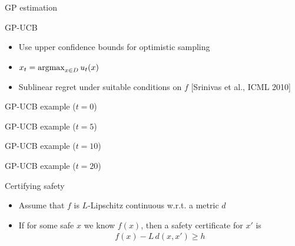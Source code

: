\documentclass[xetex,10pt,mathserif]{beamer}
\newlength\figureheight
\newlength\figurewidth
\begin{document}
\begin{frame}{GP estimation}
\centering
\setlength\figurewidth{5in}
\setlength\figureheight{3.5in}

\end{frame}

\begin{frame}{GP-UCB}
\begin{itemize}
\item<1-> Use upper confidence bounds for optimistic sampling
\vspace{2em}
\item<2-> $x_t = \argmax_{x \in D}u_t(x)$
\vspace{2em}
\item<3-> Sublinear regret under suitable conditions on $f$ [Srinivas et al., ICML 2010]
\end{itemize}
\end{frame}

\begin{frame}{GP-UCB example ($t = 0$)}
\centering
\setlength\figurewidth{5in}
\setlength\figureheight{3.5in}

\end{frame}

\begin{frame}{GP-UCB example ($t = 5$)}
\centering
\setlength\figurewidth{5in}
\setlength\figureheight{3.5in}

\end{frame}

\begin{frame}{GP-UCB example ($t = 10$)}
\centering
\setlength\figurewidth{5in}
\setlength\figureheight{3.5in}

\end{frame}

\begin{frame}{GP-UCB example ($t = 20$)}
\centering
\setlength\figurewidth{5in}
\setlength\figureheight{3.5in}

\end{frame}

\begin{frame}{Certifying safety}
\begin{itemize}
\item<1-> Assume that $f$ is $L$-Lipschitz continuous w.r.t. a metric $d$
\vspace{2em}
\item<2-> If for some safe $x$ we know $f(x)$, then a safety certificate for $x'$ is
\begin{align*}
f(x) - L\,d(x, x') \geq h
\end{align*}
\end{itemize}
\end{frame}
\end{document}
